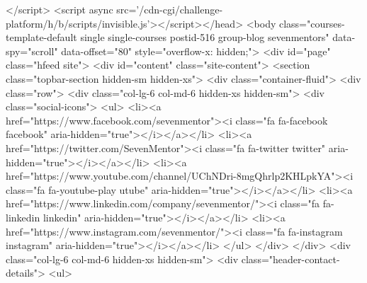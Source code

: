 {</script>
<script async src='/cdn-cgi/challenge-platform/h/b/scripts/invisible.js'></script></head>
<body class="courses-template-default single single-courses postid-516 group-blog sevenmentors" data-spy="scroll" data-offset="80" style="overflow-x: hidden;">
<div id="page" class="hfeed site">
<div id="content" class="site-content">
<section class="topbar-section hidden-sm hidden-xs">
<div class="container-fluid">
<div class="row">
<div class="col-lg-6 col-md-6 hidden-xs hidden-sm">
<div class="social-icons">
<ul>
<li><a href="https://www.facebook.com/sevenmentor"><i class="fa fa-facebook facebook" aria-hidden="true"></i></a></li>
<li><a href="https://twitter.com/SevenMentor"><i class="fa fa-twitter twitter" aria-hidden="true"></i></a></li>
<li><a href="https://www.youtube.com/channel/UChNDri-8mgQhrlp2KHLpkYA"><i class="fa fa-youtube-play utube" aria-hidden="true"></i></a></li>
<li><a href="https://www.linkedin.com/company/sevenmentor/"><i class="fa fa-linkedin linkedin" aria-hidden="true"></i></a></li>
<li><a href="https://www.instagram.com/sevenmentor/"><i class="fa fa-instagram instagram" aria-hidden="true"></i></a></li>
</ul>
</div>
</div>
<div class="col-lg-6 col-md-6 hidden-xs hidden-sm">
<div class="header-contact-details">
<ul>

}
